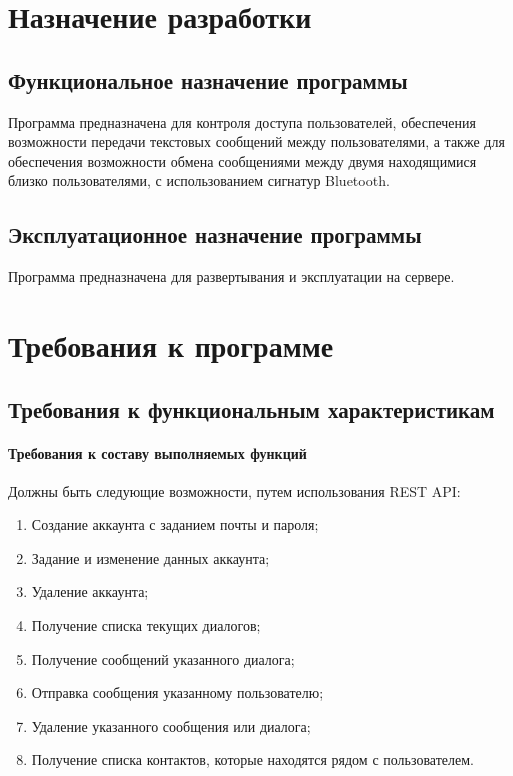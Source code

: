 \documentclass[techtask]{espd}
\begin{document}
\section{Назначение разработки}
\subsection{Функциональное назначение программы}
Программа предназначена для контроля доступа пользователей, обеспечения возможности передачи текстовых сообщений между пользователями, а также для обеспечения возможности обмена сообщениями между двумя находящимися близко пользователями, с использованием сигнатур Bluetooth.

\subsection{Эксплуатационное назначение программы}
Программа предназначена для развертывания и эксплуатации на сервере.

\section{Требования к программе}
\subsection{Требования к функциональным характеристикам}
\paragraph{Требования к составу выполняемых функций}
Должны быть следующие возможности, путем использования REST API:

\begin{enumerate}
\item Создание аккаунта с заданием почты и пароля;
\item Задание и изменение данных аккаунта;
\item Удаление аккаунта;
\item Получение списка текущих диалогов;
\item Получение сообщений указанного диалога;
\item Отправка сообщения указанному пользователю;
\item Удаление указанного сообщения или диалога;
\item Получение списка контактов, которые находятся рядом с пользователем.
\end{enumerate}
\end{document}

